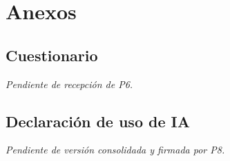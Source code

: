 \section{Anexos}

\subsection{Cuestionario}
\textit{Pendiente de recepción de P6.}

\subsection{Declaración de uso de IA}
\textit{Pendiente de versión consolidada y firmada por P8.}
